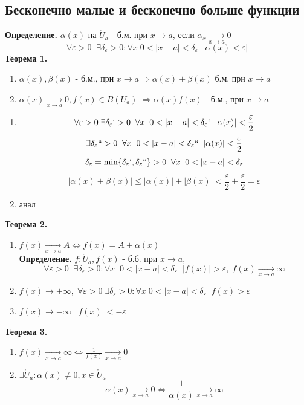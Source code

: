 \documentclass[12pt, a4paper]{article}
\newcommand{\eps}{\varepsilon}
\begin{document}
\subsection{Бесконечно малые и бесконечно больше функции}

\textbf{Определение.} $\alpha(x)$ на $\mathring U_a$ - б.м. при $x \to a$, если $\alpha_x \xrightarrow[x\to a]{} 0$
\[ \forall \eps > 0 \;\; \exists \delta_\eps > 0: \forall x\; 0 < |x - a| < \delta_\eps \;\; |\alpha(x) < \eps| \]
\textbf{Теорема 1.} 
\begin{enumerate}
	\item $\alpha(x), \beta(x)$ - б.м., при $x\to a \Rightarrow \alpha(x) \pm \beta(x)$ б.м. при $x\to a$
	\item $\alpha(x) \xrightarrow[x\to a]{} 0, f(x) \in B(U_a)$ 
		$\Rightarrow \alpha(x) f(x)$ - б.м., при $x \to a$
\end{enumerate}
\begin{tcolorbox}[title=Доказательство]
	\begin{enumerate}
	\item \[ \forall \eps > 0\; \exists \delta_\eps` > 0\;\; \forall x \;\; 0 < |x - a| < \delta_\eps` \;\; |\alpha(x)|< \frac{\eps}{2} \] 
	\[ \exists \delta_\eps`` > 0\;\; \forall x \;\; 0 < |x - a| < \delta_\eps`` \;\; |\alpha(x)|< \frac{\eps}{2} \]
	\[ \delta_\eps = \min\{ \delta_\eps`,\delta_\eps`` \} > 0 \;\; \forall x \;\; 0 < |x - a| < \delta_\eps \]
	\[ |\alpha(x) \pm \beta(x)| \leq |\alpha(x)| + |\beta(x)| < \frac{\eps}{2} + \frac{\eps}{2} = \eps \]
	\item анал
	\end{enumerate}
\end{tcolorbox}

\textbf{Теорема 2.} 
\begin{enumerate}
	\item  $f(x) \xrightarrow[x\to a]{} A \Leftrightarrow f(x) = A + \alpha(x) $\\
\textbf{Определение.} $f:\mathring U_a, f(x)$ - б.б. при $x\to a$, 
\[ \forall \eps > 0 \;\; \exists \delta_\eps > 0: \forall x \;\; 0 < |x - a| < \delta_\eps \;\; |f(x)| > \eps,\; f(x) \xrightarrow[x\to a]{} \infty \]
	\item $f(x) \to +\infty,\; \forall \eps > 0\; \exists \delta_\eps > 0: \forall x \; 0 < |x - a| < \delta_\eps \;\; f(x) > \eps$
	\item $f(x) \to -\infty \;\; |f(x)| < -\eps$
\end{enumerate}
\textbf{Теорема 3.} 
\begin{enumerate}
	\item $f(x) \xrightarrow[x\to a]{} \infty  \Leftrightarrow \frac{1}{f(x)} \xrightarrow[x\to a]{} 0$
	\item $\exists \mathring U_a: \alpha(x) \not=0, x\in \mathring U_a$\\
	\[ \alpha(x) \xrightarrow[x\to a]{} 0 \Leftrightarrow \frac{1}{\alpha(x)} \xrightarrow[x\to a]{} \infty \]
\end{enumerate}
\end{document}
